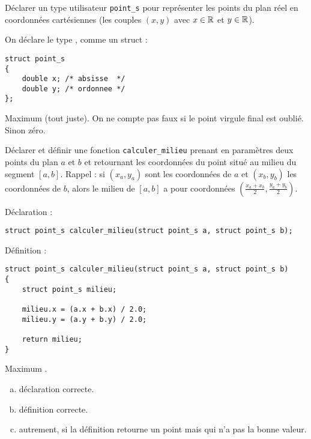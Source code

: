 \question Déclarer un type utilisateur \verb+point_s+ pour représenter les points
du plan réel en coordonnées cartésiennes (les couples $(x, y)$ avec
$x\in\mathbb{R}$ et $y\in\mathbb{R}$).

\begin{correction}
On déclare le type , comme un struct :
\begin{small}
\begin{verbatim}
struct point_s 
{
    double x; /* absisse  */
    double y; /* ordonnee */
};
\end{verbatim}
\end{small}
\end{correction}

\begin{baremeenv}
 Maximum  (tout juste). On ne compte pas faux si le point virgule
  final est oublié. Sinon zéro.
\end{baremeenv}

\question Déclarer et définir une fonction \verb+calculer_milieu+
prenant en paramètres deux points du plan $a$ et $b$ et retournant les
coordonnées du point situé au milieu du segment $[a, b]$. Rappel : si
$(x_a, y_a)$ sont les coordonnées de $a$ et $(x_b, y_b)$ les
coordonnées de $b$, alors le milieu de $[a, b]$ a pour coordonnées
$(\frac{x_a + x_b}{2}, \frac{y_a + y_b}{2})$.

\begin{correction}
Déclaration :
\begin{small}
\begin{verbatim}
struct point_s calculer_milieu(struct point_s a, struct point_s b);
\end{verbatim}
\end{small}  
Définition :
\begin{small}
\begin{verbatim}
struct point_s calculer_milieu(struct point_s a, struct point_s b)
{
    struct point_s milieu;

    milieu.x = (a.x + b.x) / 2.0;
    milieu.y = (a.y + b.y) / 2.0;

    return milieu;
}
\end{verbatim}
\end{small}  
\end{correction}
\begin{baremeenv}
Maximum .
  \begin{enumerate}[(a)]
  \item {} déclaration correcte.
  \item {} définition correcte.
  \item {} autrement, si la définition retourne un point mais qui n'a pas
  la bonne valeur.
 \end{enumerate}
\end{baremeenv}

